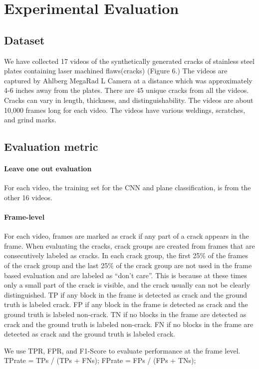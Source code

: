 \section{Experimental Evaluation}
    \subsection{Dataset}
    We have collected 17 videos of the synthetically generated cracks of stainless steel plates containing laser machined flaws(cracks) (Figure 6.) The videos are captured by Ahlberg MegaRad L Camera at a distance which was approximately 4-6 inches away from the plates.
            There are 45 unique cracks from all the videos. Cracks can vary in length, thickness, and distinguishability. 
The videos are about 10,000 frames long for each video. The videos have various weldings, scratches, and grind marks.

\subsection{Evaluation metric}
\paragraph{Leave one out evaluation}
      For each video, the training set for the CNN and plane classification, is from the other 16 videos.

\paragraph{Frame-level}
      For each video, frames are marked as crack if any part of a crack appears in the frame. When evaluating the cracks,  crack groups are created from frames that are consecutively labeled as cracks.  In each crack group, the first 25\% of the frames of the crack group and the last 25\% of the crack group are not used in the frame based evaluation and are labeled as “don’t care”. This is because at these times only a small part of the crack is visible, and the crack usually can not be clearly distinguished.
      TP if any block in the frame is detected as crack and the ground truth is labeled crack.
      FP if any block in the frame is detected as crack and the ground truth is labeled non-crack.
      TN if no blocks in the frame are detected as crack and the ground truth is labeled non-crack.
      FN if no blocks in the frame are detected as crack and the ground truth is labeled crack.

We use TPR, FPR, and F1-Score to evaluate performance at the frame level. 
TPrate = TPs / (TPs + FNs);
FPrate = FPs / (FPs + TNs);

